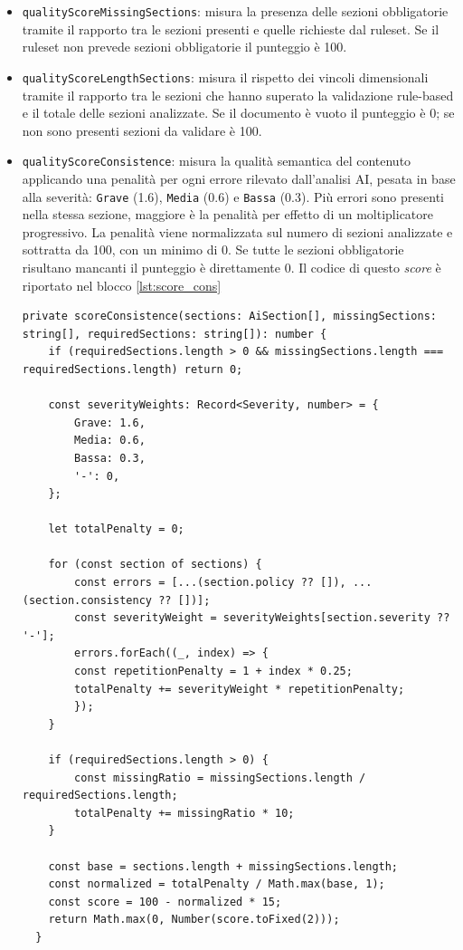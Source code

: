 \begin{itemize}
  \item \texttt{qualityScoreMissingSections}: misura la presenza delle sezioni obbligatorie tramite il rapporto tra le sezioni presenti e quelle richieste dal ruleset. Se il ruleset non prevede sezioni obbligatorie il punteggio è 100.
  \item \texttt{qualityScoreLengthSections}: misura il rispetto dei vincoli dimensionali tramite il rapporto tra le sezioni che hanno superato la validazione rule-based e il totale delle sezioni analizzate. Se il documento è vuoto il punteggio è 0; se non sono presenti sezioni da validare è 100.
  \item \texttt{qualityScoreConsistence}: misura la qualità semantica del contenuto applicando una penalità per ogni errore rilevato dall'analisi AI, pesata in base alla severità: \texttt{Grave} (1.6), \texttt{Media} (0.6) e \texttt{Bassa} (0.3). Più errori sono presenti nella stessa sezione, maggiore è la penalità per effetto di un moltiplicatore progressivo. La penalità viene normalizzata sul numero di sezioni analizzate e sottratta da 100, con un minimo di 0. Se tutte le sezioni obbligatorie risultano mancanti il punteggio è direttamente 0. Il codice di questo \emph{score} è riportato nel blocco \ref{lst:score_cons}

  \begin{lstlisting}[label={lst:score_cons}]
  private scoreConsistence(sections: AiSection[], missingSections: string[], requiredSections: string[]): number {
    if (requiredSections.length > 0 && missingSections.length === requiredSections.length) return 0;

    const severityWeights: Record<Severity, number> = {
        Grave: 1.6,
        Media: 0.6,
        Bassa: 0.3,
        '-': 0,
    };

    let totalPenalty = 0;

    for (const section of sections) {
        const errors = [...(section.policy ?? []), ...(section.consistency ?? [])];
        const severityWeight = severityWeights[section.severity ?? '-'];
        errors.forEach((_, index) => {
        const repetitionPenalty = 1 + index * 0.25;
        totalPenalty += severityWeight * repetitionPenalty;
        });
    }

    if (requiredSections.length > 0) {
        const missingRatio = missingSections.length / requiredSections.length;
        totalPenalty += missingRatio * 10;
    }

    const base = sections.length + missingSections.length;
    const normalized = totalPenalty / Math.max(base, 1);
    const score = 100 - normalized * 15;
    return Math.max(0, Number(score.toFixed(2)));
  }
  \end{lstlisting}

\end{itemize}

